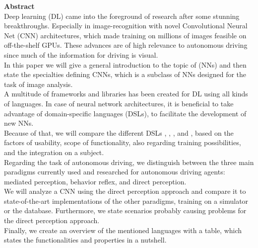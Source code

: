 {\bf\Large Abstract} \\ [1em]
Deep learning (DL) came into the foreground of research after some stunning breakthroughs. Especially in image-recognition with novel Convolutional Neural Net (CNN) architectures, which made training on millions of images feasible on off-the-shelf GPUs. These advances are of high relevance to autonomous driving since much of the information for driving is visual.\\
In this paper we will give a general introduction to the topic of \nns (NNs) and then state the specialties defining CNNs, which is a subclass of NNs designed for the task of image analysis.\\
A multitude of frameworks and libraries has been created for DL using all kinds of languages. In case of neural network architectures, it is beneficial to take advantage of domain-specific languages (DSLs), to facilitate the development of new NNs.\\
Because of that, we will compare the different DSLs \cnnarch, \caffe, \caffetwo, and \mxnet, based on the factors of usability, scope of functionality, also regarding training possibilities, and the integration on a subject.\\
Regarding the task of autonomous driving, we distinguish between the three main paradigms currently used and researched for autonomous driving agents: mediated perception, behavior reflex, and direct perception.\\
We will analyze a CNN using the direct perception approach and compare it to state-of-the-art implementations of the other paradigms, training on a simulator \torcs or the \kitti database. Furthermore, we state scenarios probably causing problems for the direct perception approach. \\
Finally, we create an overview of the mentioned languages with a table, which states the functionalities and properties in a nutshell.
\cleardoublepage

